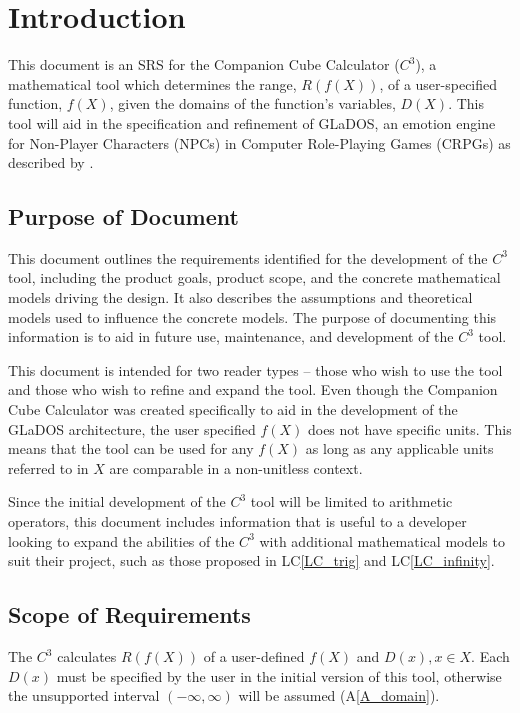 \documentclass[12pt]{article}
\newcommand{\aref}[1]{A\ref{#1}}
\newcommand{\lcref}[1]{LC\ref{#1}}
\newcommand{\progname}{Companion Cube Calculator} %
\newcommand{\prognameAbbrv}{$C^{3}$}
\begin{document}
\newpage
{}

\section{Introduction}
\label{intro}
This document is an SRS for the \progname{} (\prognameAbbrv{}), a mathematical 
tool which determines the range, $R(f(X))$, of a user-specified function, 
$f(X)$, given the domains of the function's variables, $D(X)$. This tool will 
aid in the specification and refinement of GLaDOS, an emotion engine for 
Non-Player Characters (NPCs) in Computer Role-Playing Games (CRPGs) as 
described by \citet{glados}.

\subsection{Purpose of Document}
This document outlines the requirements identified for the development of the 
\prognameAbbrv{} tool, including the product goals, product scope, and the 
concrete mathematical models driving the design. It also describes the 
assumptions and theoretical models used to influence the concrete models. The 
purpose of documenting this information is to aid in future use, maintenance, 
and development of the \prognameAbbrv{} tool.

This document is intended for two reader types -- those who wish to use the 
tool and those who wish to refine and expand the tool. Even though the 
\progname{} was created specifically to aid in the development of the GLaDOS 
architecture, the user specified $f(X)$ does not have specific units. This 
means that the tool can be used for any $f(X)$ as long as any applicable units 
referred to in $X$ are comparable in a non-unitless context.

Since the initial development of the \prognameAbbrv{} tool will be limited to 
arithmetic operators, this document includes information that is useful to a 
developer looking to expand the abilities of the \prognameAbbrv{} with 
additional mathematical models to suit their project, such as those proposed in 
\lcref{LC_trig} and \lcref{LC_infinity}. 

\subsection{Scope of Requirements} 
The \prognameAbbrv{} calculates $R(f(X))$ of a user-defined $f(X)$ and $D(x), x 
\in X$. Each $D(x)$ must be specified by the user in the initial version of 
this tool, otherwise the unsupported interval $(-\infty, \infty)$ will be 
assumed (\aref{A_domain}). 
\end{document}
